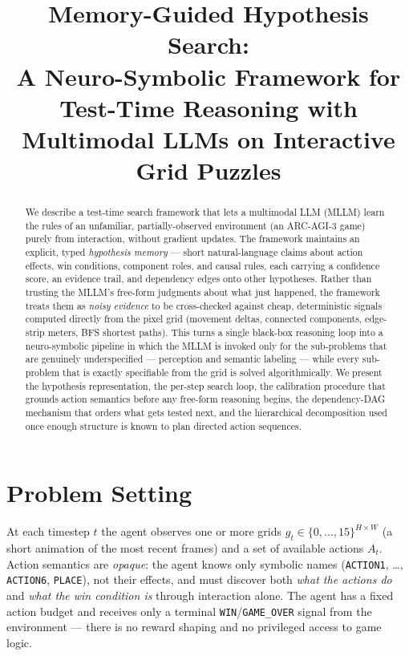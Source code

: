 \documentclass{article}
\title{Memory-Guided Hypothesis Search:\\
A Neuro-Symbolic Framework for Test-Time Reasoning with\\
Multimodal LLMs on Interactive Grid Puzzles}
\author{}
\date{}
\begin{document}
\maketitle

\begin{abstract}
We describe a test-time search framework that lets a multimodal LLM (MLLM)
learn the rules of an unfamiliar, partially-observed environment (an
ARC-AGI-3 game) purely from interaction, without gradient updates. The
framework maintains an explicit, typed \emph{hypothesis memory} —
short natural-language claims about action effects, win conditions,
component roles, and causal rules, each carrying a confidence score,
an evidence trail, and dependency edges onto other hypotheses. Rather
than trusting the MLLM's free-form judgments about what just happened,
the framework treats them as \emph{noisy evidence} to be cross-checked
against cheap, deterministic signals computed directly from the pixel
grid (movement deltas, connected components, edge-strip meters, BFS
shortest paths). This turns a single black-box reasoning loop into a
neuro-symbolic pipeline in which the MLLM is invoked only for the
sub-problems that are genuinely underspecified — perception and
semantic labeling — while every sub-problem that is exactly
specifiable from the grid is solved algorithmically. We present the
hypothesis representation, the per-step search loop, the calibration
procedure that grounds action semantics before any free-form reasoning
begins, the dependency-DAG mechanism that orders what gets tested next,
and the hierarchical decomposition used once enough structure is known
to plan directed action sequences.
\end{abstract}

\section{Problem Setting}
\label{sec:setting}

At each timestep $t$ the agent observes one or more grids
$g_t \in \{0,\dots,15\}^{H\times W}$ (a short animation of the most
recent frames) and a set of available actions $A_t$. Action semantics
are \emph{opaque}: the agent knows only symbolic names
(\texttt{ACTION1}, \dots, \texttt{ACTION6}, \texttt{PLACE}), not their
effects, and must discover both \emph{what the actions do} and
\emph{what the win condition is} through interaction alone. The agent
has a fixed action budget and receives only a terminal
\texttt{WIN}/\texttt{GAME\_OVER} signal from the environment — there is
no reward shaping and no privileged access to game logic.
\end{document}
